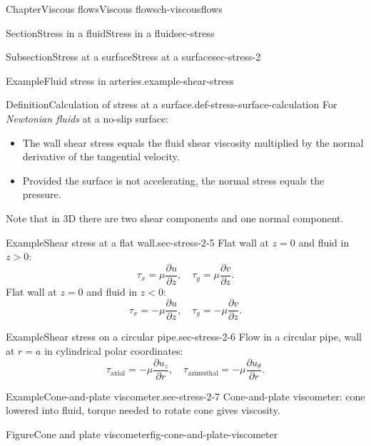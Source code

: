 \documentclass[oneside,10pt,]{book}
\numberwithin{equation}{section}
\newcommand{\pd}[2]{\frac{\partial#1}{\partial#2}}
\begin{document}
\begin{chapterptx}{Chapter}{Viscous flows}{}{Viscous flows}{}{}{ch-viscousflows}
\begin{sectionptx}{Section}{Stress in a fluid}{}{Stress in a fluid}{}{}{sec-stress}
\begin{subsectionptx}{Subsection}{Stress at a surface}{}{Stress at a surface}{}{}{sec-stress-2}
\begin{example}{Example}{Fluid stress in arteries.}{example-shear-stress}
\end{example}
\begin{definition}{Definition}{Calculation of stress at a surface.}{def-stress-surface-calculation}%
For \emph{Newtonian fluids} at a no-slip surface:%
\begin{itemize}[label=\textbullet]
\item{}The wall shear stress equals the fluid shear viscosity multiplied by the normal derivative of the tangential velocity.%
\item{}Provided the surface is not accelerating, the normal stress equals the pressure.%
\end{itemize}
Note that in 3D there are two shear components and one normal component.%
\end{definition}
\begin{example}{Example}{Shear stress at a flat wall.}{sec-stress-2-5}%
Flat wall at \(z=0\) and fluid in \(z>0\):%
\begin{equation*}
\tau_x = \mu\pd{u}{z},\quad \tau_y = \mu\pd{v}{z}.
\end{equation*}
Flat wall at \(z=0\) and fluid in \(z<0\):%
\begin{equation*}
\tau_x = -\mu\pd{u}{z},\quad \tau_y = -\mu\pd{v}{z}.
\end{equation*}
%
\end{example}
\begin{example}{Example}{Shear stress on a circular pipe.}{sec-stress-2-6}%
Flow in a circular pipe, wall at \(r=a\) in cylindrical polar coordinates:%
\begin{equation*}
\tau_{\textrm{axial}} = -\mu\pd{u_z}{r},\quad
\tau_{\textrm{azimuthal}} = -\mu\pd{u_{\theta}}{r}.
\end{equation*}
%
\end{example}
\begin{example}{Example}{Cone-and-plate viscometer.}{sec-stress-2-7}%
Cone-and-plate viscometer: cone lowered into fluid, torque needed to rotate cone gives viscosity.%
\begin{figureptx}{Figure}{Cone and plate viscometer}{fig-cone-and-plate-viscometer}{}%
\begin{image}{0.25}{0.5}{0.25}{}%

\end{image}
\end{figureptx}
\end{example}
\end{subsectionptx}
\end{sectionptx}
\end{chapterptx}
\end{document}
